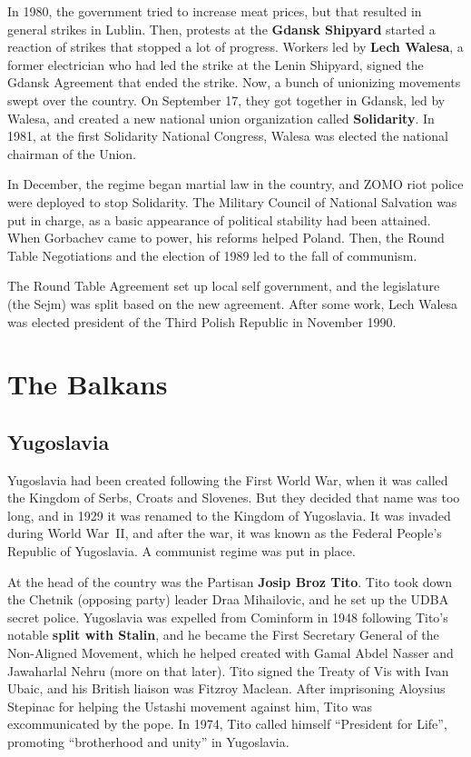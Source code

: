 In 1980, the government tried to increase meat prices,
but that resulted in general strikes in Lublin.
Then, protests at the \textbf{Gdansk Shipyard}
started a reaction of strikes that stopped a lot of progress.
Workers led by \textbf{Lech Walesa},
a former electrician who had led the strike at the Lenin Shipyard,
signed the Gdansk Agreement that ended the strike.
Now, a bunch of unionizing movements swept over the country.
On September 17, they got together in Gdansk, led by Walesa,
and created a new national union organization called \textbf{Solidarity}.
In 1981, at the first Solidarity National Congress,
Walesa was elected the national chairman of the Union.

In December,
the regime began martial law in the country, and ZOMO riot police were deployed to stop Solidarity.
The Military Council of National Salvation was put in charge,
as a basic appearance of political stability had been attained.
When Gorbachev came to power, his reforms helped Poland.
Then, the Round Table Negotiations and the election of 1989 led to the fall of communism.

The Round Table Agreement set up local self government,
and the legislature (the Sejm) was split based on the new agreement.
After some work, Lech Walesa was elected president of the Third Polish Republic in November 1990.

\section{The Balkans}

\subsection*{Yugoslavia}

Yugoslavia had been created following the First World War,
when it was called the Kingdom of Serbs, Croats and Slovenes.
But they decided that name was too long, and in 1929 it was renamed to the Kingdom of Yugoslavia.
It was invaded during World War~II,
and after the war, it was known as the Federal People's Republic of Yugoslavia.
A communist regime was put in place.

At the head of the country was the Partisan \textbf{Josip Broz Tito}.
Tito took down the Chetnik (opposing party) leader Draa Mihailovic,
and he set up the UDBA secret police.
Yugoslavia was expelled from Cominform in 1948 following Tito's notable \textbf{split with Stalin},
and he became the First Secretary General of the Non-Aligned Movement,
which he helped created with Gamal Abdel Nasser and Jawaharlal Nehru (more on that later).
Tito signed the Treaty of Vis with Ivan Ubaic, and his British liaison was Fitzroy Maclean.
After imprisoning Aloysius Stepinac for helping the Ustashi movement against him,
Tito was excommunicated by the pope.
In 1974, Tito called himself ``President for Life'',
promoting ``brotherhood and unity'' in Yugoslavia.

